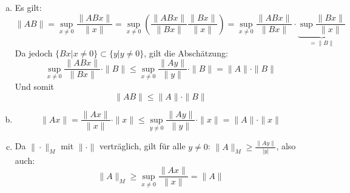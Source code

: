\documentclass{mywork}
\begin{document}
\begin{aufgabe}
\begin{enumerate}[(a)]
\item
Es gilt:
\[
\|AB\|
=\sup_{x\neq 0}\frac{\|ABx\|}{\|x\|}
=\sup_{x\neq 0}\left(\frac{\|ABx\|}{\|Bx\|}\frac{\|Bx\|}{\|x\|}\right)
=\sup_{x\neq 0}\frac{\|ABx\|}{\|Bx\|}\cdot\underbrace{\sup\frac{\|Bx\|}{\|x\|}}_{=\|B\|}
\]
Da jedoch $\{Bx|x\neq 0\}\subset\{y|y\neq 0\}$, gilt die Abschätzung:
\[
\sup_{x\neq 0}\frac{\|ABx\|}{\|Bx\|}\cdot\|B\|
\le \sup_{x\neq 0}\frac{\|Ay\|}{\|y\|}\cdot\|B\|
= \|A\|\cdot\|B\|
\]
Und somit
\[
\|AB\|\le \|A\|\cdot\|B\|
\]
\item
\[
\|Ax\| 
= \frac{\|Ax\|}{\|x\|}\cdot \|x\|
\le \sup_{y\neq 0}\frac{\|Ay\|}{\|y\|}\cdot \|x\|
= \|A\|\cdot\|x\|
\]
\item
	Da $\|\cdot\|_M$ mit $\|\cdot\|$ verträglich, gilt für alle $y\neq 0$: $\|A\|_M\ge \frac {\|Ay\|}{|y|}$, also auch:
\[
\|A\|_M
\ge \sup_{x\neq 0}\frac{\|Ax\|}{\|x\|}
= \|A\|
\]
\end{enumerate}

\end{aufgabe}
\end{document}
